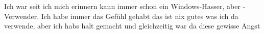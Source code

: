 Ich war seit ich mich erinnern kann immer schon ein Windows-Hasser, aber -Verwender. Ich habe immer das Gefühl gehabt das ist nix gutes was ich da verwende, aber ich habs halt gemacht und gleichzeitig war da diese gewisse Angst
